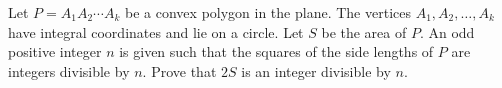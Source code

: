 Let $P=A_1A_2\cdots A_k$ be a convex polygon in the plane. The vertices $A_1, A_2, \ldots, A_k$ have integral coordinates and lie on a circle. Let $S$ be the area of $P$. An odd positive integer $n$ is given such that the squares of the side lengths of $P$ are integers divisible by $n$. Prove that $2S$ is an integer divisible by $n$.